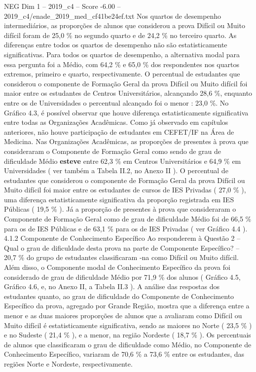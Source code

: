 \begin{textsample}{NEG Dim 1 – 2019\_c4 – Score -6.00 – 2019\_c4/enade\_2019\_med\_cf41be24ef.txt}
Nos quartos de desempenho intermediários, as proporções de alunos que considerou a prova Difícil ou Muito difícil foram de 25,0 \% no segundo quarto e de 24,2 \% no terceiro quarto.
As diferenças entre todos os quartos de desempenho não são estatisticamente significativas.
Para todos os quartos de desempenho, a alternativa modal para essa pergunta foi a Médio, com 64,2 \% e 65,0 \% dos respondentes nos quartos extremos, primeiro e quarto, respectivamente.
O percentual de estudantes que considerou o componente de Formação Geral da prova Difícil ou Muito difícil foi maior entre os estudantes de Centros Universitários, alcançando 28,6 \%, enquanto entre os de Universidades o percentual alcançado foi o menor : 23,0 \%.
No Gráfico 4.3, é possível observar que houve diferença estatisticamente significativa entre todas as Organizações Acadêmicas.
Como já observado em capítulos anteriores, não houve participação de estudantes em CEFET/IF na Área de Medicina.
Nas Organizações Acadêmicas, as proporções de presentes à prova que consideraram o Componente de Formação Geral como sendo de grau de dificuldade Médio \textbf{esteve} entre 62,3 \% em Centros Universitários e 64,9 \% em Universidades ( ver também a Tabela II.2, no Anexo II ).
O percentual de estudantes que considerou o componente de Formação Geral da prova Difícil ou Muito difícil foi maior entre os estudantes de cursos de IES Privadas ( 27,0 \% ), uma diferença estatisticamente significativa da proporção registrada em IES Públicas ( 19,5 \% ).
Já a proporção de presentes à prova que consideraram o Componente de Formação Geral como de grau de dificuldade Médio foi de 66,5 \% para os de IES Públicas e de 63,1 \% para os de IES Privadas ( ver Gráfico 4.4 ). 4.1.2 Componente de Conhecimento Específico Ao responderem à Questão 2 – Qual o grau de dificuldade desta prova na parte de Componente Específico? – 20,7 \% do grupo de estudantes classificaram -na como Difícil ou Muito difícil.
Além disso, o Componente modal de Conhecimento Específico da prova foi considerado de grau de dificuldade Médio por 71,9 \% dos alunos ( Gráfico 4.5, Gráfico 4.6, e, no Anexo II, a Tabela II.3 ).
A análise das respostas dos estudantes quanto, ao grau de dificuldade do Componente de Conhecimento Específico da prova, agregado por Grande Região, mostra que a diferença entre a menor e as duas maiores proporções de alunos que a avaliaram como Difícil ou Muito difícil é estatisticamente significativa, sendo as maiores no Norte ( 23,5 \% ) e no Sudeste ( 21,4 \% ), e a menor, na região Nordeste ( 18,7 \% ).
Os percentuais de alunos que classificaram o grau de dificuldade como Médio, no Componente de Conhecimento Específico, variaram de 70,6 \% a 73,6 \% entre os estudantes, das regiões Norte e Nordeste, respectivamente.

\end{textsample}
